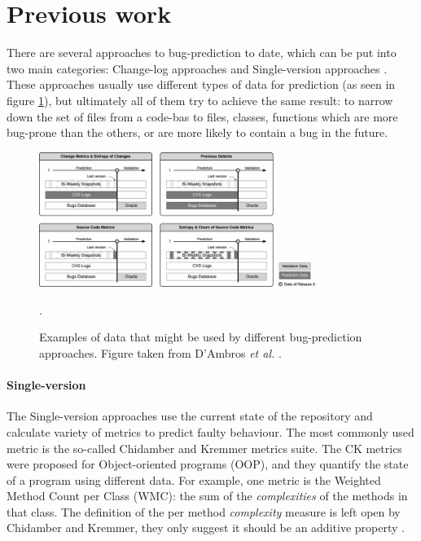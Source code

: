 \documentclass[12pt,twoside,notitlepage]{report}
\newcommand{\etal}{\textit{et al.}}
\begin{document}
\section{Previous work}
There are several approaches to bug-prediction to date, which can be put into two main categories: Change-log approaches and Single-version approaches \cite{5463279}. These approaches usually use different types of data for prediction (as seen in figure \ref{bug_prediction_data}), but ultimately all of them try to achieve the same result: to narrow down the set of files from a code-bas to files, classes, functions which are more bug-prone than the others, or are more likely to contain a bug in the future.
\begin{figure}[h]
\vspace*{0.1in}
\hspace*{0.1\textwidth}
\includegraphics[width=0.8\textwidth]{bug_prediction_data.png}
\centering
\captionsetup{width=0.7\textwidth}

\caption[Examples of data that might be used by different bug-prediction approaches]{Examples of data that might be used by different bug-prediction approaches. Figure taken from D'Ambros \etal{} \cite{5463279}.}.
\label{bug_prediction_data}
\end{figure}

\paragraph{Single-version}The Single-version approaches use the current state of the repository and calculate variety of metrics  to predict faulty behaviour. The most commonly used metric is the so-called Chidamber and Kremmer metrics suite\cite{295895}. The CK metrics were proposed for Object-oriented programs (OOP), and they quantify the state of a program using different data. For example, one metric is the Weighted Method Count per Class (WMC): the sum of the \textit{complexities} of the methods in that class. The definition of the per method \textit{complexity} measure is left open by Chidamber and Kremmer, they only suggest it should be an additive property \cite{295895}.
\end{document}
